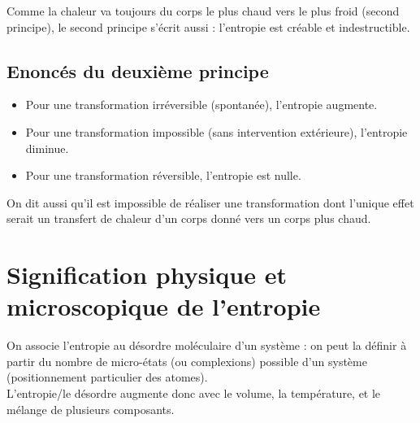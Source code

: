 \documentclass[13pt, twoside, a4paper, french]{report}
\begin{document}

            Comme la chaleur va toujours du corps le plus chaud vers le plus froid (second principe), le second principe s'écrit aussi :
            l'entropie est créable et indestructible.

        \subsection{Enoncés du deuxième principe}

            \begin{itemize}
                \item Pour une transformation irréversible (spontanée), l'entropie augmente.
                \item Pour une transformation impossible (sans intervention extérieure), l'entropie diminue.
                \item Pour une transformation réversible, l'entropie est nulle.\vspace{5pt}
            \end{itemize}
            On dit aussi qu'il est impossible de réaliser une transformation dont l'unique effet serait un transfert de chaleur d'un corps donné vers un corps plus chaud.


    \section{Signification physique et microscopique de l’entropie}

        On associe l'entropie au désordre moléculaire d'un système : on peut la définir à partir du nombre de micro-états (ou complexions) possible d'un système (positionnement particulier des atomes).\\
        L'entropie/le désordre augmente donc avec le volume, la température, et le mélange de plusieurs composants.\\
\end{document}
